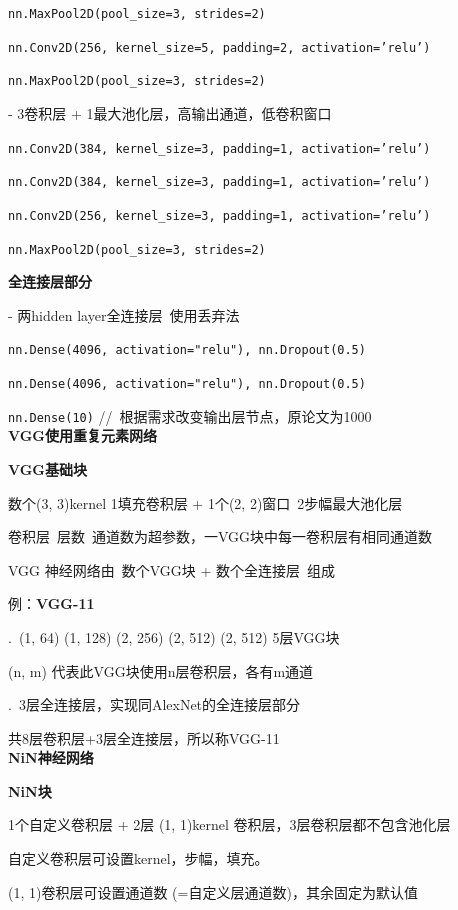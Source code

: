 \documentclass[UTF8]{ctexart}
\begin{document}
  \quad \texttt{nn.MaxPool2D(pool\_size=3, strides=2)}

  \quad \texttt{nn.Conv2D(256, kernel\_size=5, padding=2, activation='relu')}

  \quad \texttt{nn.MaxPool2D(pool\_size=3, strides=2)}
  
  \quad - 3卷积层 + 1最大池化层，高输出通道，低卷积窗口
  
  \quad \texttt{nn.Conv2D(384, kernel\_size=3, padding=1, activation='relu')}
  
  \quad \texttt{nn.Conv2D(384, kernel\_size=3, padding=1, activation='relu')} 
  
  \quad \texttt{nn.Conv2D(256, kernel\_size=3, padding=1, activation='relu')}
  
  \quad \texttt{nn.MaxPool2D(pool\_size=3, strides=2)}

  \textbf{全连接层部分}
  
  \quad - 两hidden layer全连接层\ 使用丢弃法

  \quad \texttt{nn.Dense(4096, activation="relu"), nn.Dropout(0.5)}
  
  \quad \texttt{nn.Dense(4096, activation="relu"), nn.Dropout(0.5)}
  
  \quad \texttt{nn.Dense(10)} //\ 根据需求改变输出层节点，原论文为1000\\
\textbf{VGG使用重复元素网络}

  \textbf{VGG基础块}

  \quad 数个(3, 3)kernel 1填充卷积层 + 1个(2, 2)窗口\ 2步幅最大池化层

  \quad 卷积层\ 层数\ 通道数为超参数，一VGG块中每一卷积层有相同通道数

  VGG 神经网络由\ 数个VGG块 + 数个全连接层\ 组成

  例：\textbf{VGG-11}
  
  .\ (1, 64) (1, 128) (2, 256) (2, 512) (2, 512) 5层VGG块

  \quad \quad (n, m) 代表此VGG块使用n层卷积层，各有m通道
  
  .\ 3层全连接层，实现同AlexNet的全连接层部分
  
  \quad 共8层卷积层+3层全连接层，所以称VGG-11\\
\textbf{NiN神经网络}

  \textbf{NiN块}

  \quad 1个自定义卷积层 + 2层 (1, 1)kernel 卷积层，3层卷积层都不包含池化层

  \quad 自定义卷积层可设置kernel，步幅，填充。
  
  \quad (1, 1)卷积层可设置通道数 (=自定义层通道数)，其余固定为默认值
\end{document}
